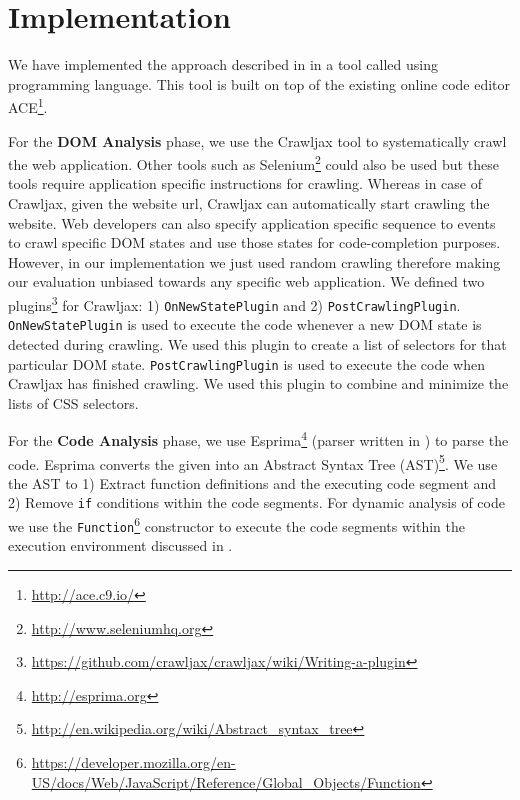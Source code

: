 \section{Implementation}
\label{Sec:Implementation}

We have implemented the approach described in  in a tool called \dompletion using \javascript programming language. This tool is built on top of the existing online code editor ACE\footnote{\url{http://ace.c9.io/}}.

For the \textbf{DOM Analysis} phase, we use the Crawljax\cite{crawljax:tweb12} tool to systematically crawl the web application. Other tools such as Selenium\footnote{\url{http://www.seleniumhq.org}} could also be used but these tools require application specific instructions for crawling. Whereas in case of Crawljax, given the website url, Crawljax can automatically start crawling the website. Web developers can also specify application specific sequence to events to crawl specific DOM states and use those states for code-completion purposes. However, in our implementation we just used random crawling therefore making our evaluation unbiased towards any specific web application. We defined two plugins\footnote{\url{https://github.com/crawljax/crawljax/wiki/Writing-a-plugin}} for Crawljax: 1) \texttt{OnNewStatePlugin} and 2) \texttt{PostCrawlingPlugin}. \texttt{OnNewStatePlugin} is used to execute the code whenever a new DOM state is detected during crawling. We used this plugin to create a list of \css selectors for that particular DOM state. \texttt{PostCrawlingPlugin} is used to execute the code when Crawljax has finished crawling. We used this plugin to combine and minimize the lists of CSS selectors.

For the \textbf{Code Analysis} phase, we use Esprima\footnote{\url{http://esprima.org}} (\javascript parser written in \javascript) to parse the \javascript code. Esprima converts the given \javascript into an Abstract Syntax Tree (AST)\footnote{\url{http://en.wikipedia.org/wiki/Abstract_syntax_tree}}. We use the AST to 1) Extract function definitions and the executing code segment and 2) Remove \texttt{if} conditions within the code segments. For dynamic analysis of \javascript code we use the \texttt{Function}\footnote{\url{https://developer.mozilla.org/en-US/docs/Web/JavaScript/Reference/Global_Objects/Function}} constructor to execute the code segments within the execution environment discussed in .


